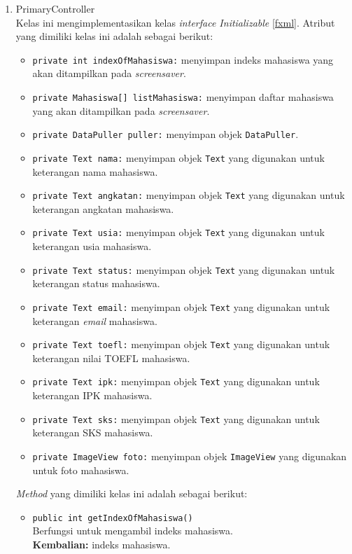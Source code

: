 \begin{enumerate}
\item{PrimaryController}\\
Kelas ini mengimplementasikan kelas \textit{interface Initializable} \ref{fxml}. Atribut yang dimiliki kelas ini adalah sebagai berikut:
\begin{itemize}
    \item \texttt{private int indexOfMahasiswa:} menyimpan indeks mahasiswa yang akan ditampilkan pada \textit{screensaver}.
    \item \texttt{private Mahasiswa[] listMahasiswa:} menyimpan daftar mahasiswa yang akan ditampilkan pada \textit{screensaver}.
    \item \texttt{private DataPuller puller:} menyimpan objek \texttt{DataPuller}.
    \item \texttt{private Text nama:} menyimpan objek \texttt{Text} yang digunakan untuk keterangan nama mahasiswa.
    \item \texttt{private Text angkatan:} menyimpan objek \texttt{Text} yang digunakan untuk keterangan angkatan mahasiswa.
    \item \texttt{private Text usia:} menyimpan objek \texttt{Text} yang digunakan untuk keterangan usia mahasiswa.
    \item \texttt{private Text status:} menyimpan objek \texttt{Text} yang digunakan untuk keterangan status mahasiswa.
    \item \texttt{private Text email:} menyimpan objek \texttt{Text} yang digunakan untuk keterangan \textit{email} mahasiswa.
    \item \texttt{private Text toefl:} menyimpan objek \texttt{Text} yang digunakan untuk keterangan nilai TOEFL mahasiswa.
    \item \texttt{private Text ipk:} menyimpan objek \texttt{Text} yang digunakan untuk keterangan IPK mahasiswa.
    \item \texttt{private Text sks:} menyimpan objek \texttt{Text} yang digunakan untuk keterangan SKS mahasiswa.
    \item \texttt{private ImageView foto:} menyimpan objek \texttt{ImageView} yang digunakan untuk foto mahasiswa.
\end{itemize}
\textit{Method} yang dimiliki kelas ini adalah sebagai berikut:
\begin{itemize}
    \item \texttt{public int getIndexOfMahasiswa()}\\
    Berfungsi untuk mengambil indeks mahasiswa.\\
	\textbf{Kembalian:} indeks mahasiswa.

\end{itemize}
\end{enumerate}
